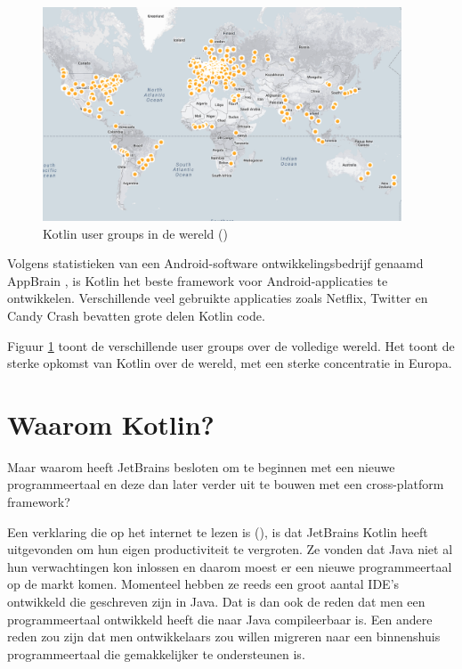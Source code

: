 \begin{figure} [ht]
	\centering
	\includegraphics[width=0.95\textwidth]{img/KUGmap.png}
	\caption{Kotlin user groups in de wereld (\cite{JetBrains12})}
	\label{fig:usergroups}
\end{figure}

Volgens statistieken van een Android-software ontwikkelingsbedrijf genaamd AppBrain \autocite{AppBrain}, is Kotlin het beste framework voor Android-applicaties te ontwikkelen. Verschillende veel gebruikte applicaties zoals Netflix, Twitter en Candy Crash bevatten grote delen Kotlin code.

Figuur \ref{fig:usergroups} toont de verschillende user groups over de volledige wereld. Het toont de sterke opkomst van Kotlin over de wereld, met een sterke concentratie in Europa.

\section{Waarom Kotlin?}
\label{sec:whykotlin}
Maar waarom heeft JetBrains besloten om te beginnen met een nieuwe programmeertaal en deze dan later verder uit te bouwen met een cross-platform framework?

Een verklaring die op het internet te lezen is (\cite{TechYourChance}), is dat JetBrains Kotlin heeft uitgevonden om hun eigen productiviteit te vergroten. Ze vonden dat Java niet al hun verwachtingen kon inlossen en daarom moest er een nieuwe programmeertaal op de markt komen. Momenteel hebben ze reeds een groot aantal IDE's ontwikkeld die geschreven zijn in Java. Dat is dan ook de reden dat men een programmeertaal ontwikkeld heeft die naar Java compileerbaar is. Een andere reden zou zijn dat men ontwikkelaars zou willen migreren naar een binnenshuis programmeertaal die gemakkelijker te ondersteunen is.

